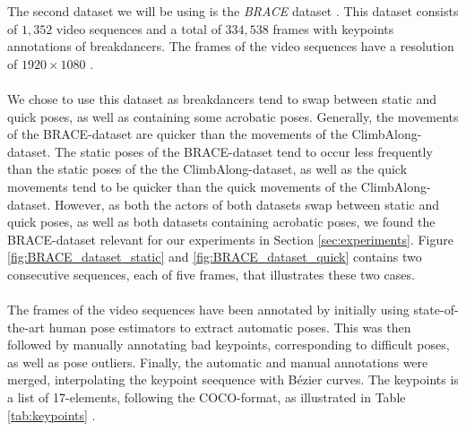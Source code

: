 \documentclass[./main.tex]{subfiles}
\begin{document}
\noindent The second dataset we will be using is the \textit{BRACE} dataset \cite{BRACE}. This dataset consists of $1,352$ video sequences and a total of $334,538$ frames with keypoints annotations of breakdancers. The frames of the video sequences have a resolution of $1920 \times 1080$ \cite{BRACE}.
\\
\\
We chose to use this dataset as breakdancers tend to swap between static and quick poses, as well as containing some acrobatic poses. Generally, the movements of the BRACE-dataset are quicker than the movements of the ClimbAlong-dataset. The static poses of the BRACE-dataset tend to occur less frequently than the static poses of the the ClimbAlong-dataset, as well as the quick movements tend to be quicker than the quick movements of the ClimbAlong-dataset. However, as both the actors of both datasets swap between static and quick poses, as well as both datasets containing acrobatic poses, we found the BRACE-dataset relevant for our experiments in Section \ref{sec:experiments}. Figure \ref{fig:BRACE_dataset_static} and \ref{fig:BRACE_dataset_quick} contains two consecutive sequences, each of five frames, that illustrates these two cases.
\\
\\
The frames of the video sequences have been annotated by initially using state-of-the-art human pose estimators to extract automatic poses. This was then followed by manually annotating bad keypoints, corresponding to difficult poses, as well as pose outliers. Finally, the automatic and manual annotations were merged, interpolating the keypoint seequence with Bézier curves. The keypoints is a list of 17-elements, following the COCO-format, as illustrated in Table \ref{tab:keypoints} \cite{BRACE}.
\end{document}
